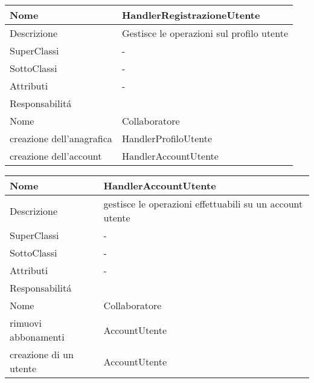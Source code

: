 \begin{center} %
    \begin{longtable}{ |p{3cm}|p{3cm}|p{3cm}|p{3cm}| }
        \hline
        Nome & \multicolumn{3}{|p{9cm}|}{HandlerRegistrazioneUtente} \\\hline
        Descrizione & \multicolumn{3}{|p{9cm}|}{Gestisce le operazioni sul profilo utente} \\\hline
        SuperClassi & \multicolumn{3}{|p{9cm}|}{-} \\\hline
        SottoClassi & \multicolumn{3}{|p{9cm}|}{-} \\\hline
        Attributi & \multicolumn{3}{|p{9cm}|}{-} \\\hline
        \multicolumn{4}{|p{12cm}|}{Responsabilit\'a} \\\hline %
        \multicolumn{2}{|p{6cm}|}{Nome} & \multicolumn{2}{|p{6cm}|}{Collaboratore} \\\hline %
        \multicolumn{2}{|p{6cm}|}{creazione dell'anagrafica} & \multicolumn{2}{|p{6cm}|}{HandlerProfiloUtente} \\\hline
        \multicolumn{2}{|p{6cm}|}{creazione dell'account} & \multicolumn{2}{|p{6cm}|}{HandlerAccountUtente} \\\hline
        
    \end{longtable}
\end{center}

\begin{center} %
    \begin{longtable}{ |p{3cm}|p{3cm}|p{3cm}|p{3cm}| }
        \hline
        Nome & \multicolumn{3}{|p{9cm}|}{HandlerAccountUtente} \\\hline
        Descrizione & \multicolumn{3}{|p{9cm}|}{gestisce le operazioni effettuabili su un account utente} \\\hline
        SuperClassi & \multicolumn{3}{|p{9cm}|}{-} \\\hline
        SottoClassi & \multicolumn{3}{|p{9cm}|}{-} \\\hline
        Attributi & \multicolumn{3}{|p{9cm}|}{-} \\\hline
        \multicolumn{4}{|p{12cm}|}{Responsabilit\'a} \\\hline %
        \multicolumn{2}{|p{6cm}|}{Nome} & \multicolumn{2}{|p{6cm}|}{Collaboratore} \\\hline %
        \multicolumn{2}{|p{6cm}|}{rimuovi abbonamenti} & \multicolumn{2}{|p{6cm}|}{AccountUtente} \\\hline
        \multicolumn{2}{|p{6cm}|}{creazione di un utente} & \multicolumn{2}{|p{6cm}|}{AccountUtente} \\\hline
    \end{longtable}
\end{center}

